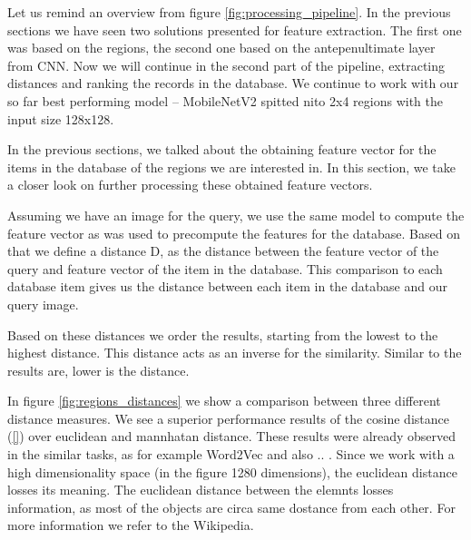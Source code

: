 Let us remind an overview from figure \ref{fig:processing_pipeline}. In the previous sections we have seen two solutions presented for feature extraction. The first one was based on the regions, the second one based on the antepenultimate layer from CNN. Now we will continue in the second part of the pipeline, extracting distances and ranking the records in the database. We continue to work with our so far best performing model -- MobileNetV2 spitted nito 2x4 regions with the input size 128x128.

In the previous sections, we talked about the obtaining feature vector for the items in the database of the regions we are interested in. In this section, we take a closer look on further processing these obtained feature vectors.

Assuming we have an image for the query, we use the same model to compute the feature vector as was used to precompute the features for the database. Based on that we define a distance D, as the distance between the feature vector of the query and feature vector of the item in the database. This comparison to each database item gives us the distance between each item in the database and our query image.

Based on these distances we order the results, starting from the lowest to the highest distance. This distance acts as an inverse for the similarity. Similar to the results are, lower is the distance.


In figure \ref{fig:regions_distances} we show a comparison between three different distance measures. We see a superior performance results of the cosine distance (\ref{}\todo{}) over euclidean and mannhatan distance. These results were already observed in the similar tasks, as for example Word2Vec and also .. . Since we work with a high dimensionality space (in the figure 1280 dimensions), the euclidean distance losses its meaning. The euclidean distance between the elemnts losses information, as most of the objects are circa same dostance from each other. For more information we refer to the Wikipedia. 


